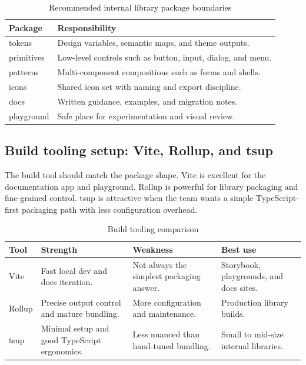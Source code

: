 \begin{table}[htbp]
  \centering
  \caption{Recommended internal library package boundaries}
  \begin{tabularx}{\textwidth}{@{}p{}Y@{}}
    \toprule
    \textbf{Package} & \textbf{Responsibility} \\
    \midrule
    tokens & Design variables, semantic maps, and theme outputs. \\
    primitives & Low-level controls such as button, input, dialog, and menu. \\
    patterns & Multi-component compositions such as forms and shells. \\
    icons & Shared icon set with naming and export discipline. \\
    docs & Written guidance, examples, and migration notes. \\
    playground & Safe place for experimentation and visual review. \\
    \bottomrule
  \end{tabularx}
\end{table}

\subsection{Build tooling setup: Vite, Rollup, and tsup}
The build tool should match the package shape. Vite is excellent for the documentation app and playground. Rollup is powerful for library packaging and fine-grained control. tsup is attractive when the team wants a simple TypeScript-first packaging path with less configuration overhead.

\begin{table}[htbp]
  \centering
  \caption{Build tooling comparison}
  \begin{tabularx}{\textwidth}{@{}p{}p{}p{}Y@{}}
    \toprule
    \textbf{Tool} & \textbf{Strength} & \textbf{Weakness} & \textbf{Best use} \\
    \midrule
    Vite & Fast local dev and docs iteration. & Not always the simplest packaging answer. & Storybook, playgrounds, and docs sites. \\
    Rollup & Precise output control and mature bundling. & More configuration and maintenance. & Production library builds. \\
    tsup & Minimal setup and good TypeScript ergonomics. & Less nuanced than hand-tuned bundling. & Small to mid-size internal libraries. \\
    \bottomrule
  \end{tabularx}
\end{table}

